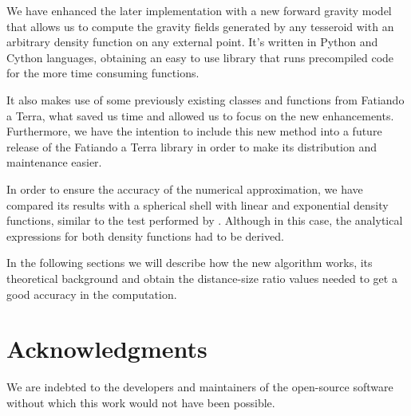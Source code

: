 \documentclass[extra]{gji}
\begin{document}
We have enhanced the later implementation with a new forward gravity model that allows us to compute the gravity fields generated by any tesseroid with an arbitrary density function on any external point.
It's written in Python and Cython languages, obtaining an easy to use library that runs precompiled code for the more time consuming functions.

It also makes use of some previously existing classes and functions from Fatiando a Terra, what saved us time and allowed us to focus on the new enhancements. Furthermore, we have the intention to include this new method into a future release of the Fatiando a Terra library in order to make its distribution and maintenance easier.

In order to ensure the accuracy of the numerical approximation, we have compared its results with a spherical shell with linear and exponential density functions, similar to the test performed by \cite{Uieda2016}. Although in this case, the analytical expressions for both density functions had to be derived.

In the following sections we will describe how the new algorithm works, its theoretical background and obtain the distance-size ratio values needed to get a good accuracy in the computation.



\section{Acknowledgments}

We are indebted to the developers and maintainers of the open-source
software without which this work would not have been possible.




\end{document}
